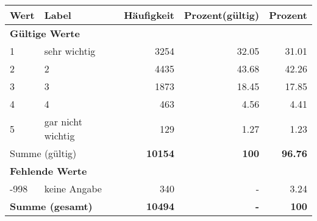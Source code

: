      \begin{longtable}{lXrrr}
     \toprule
     \textbf{Wert} & \textbf{Label} & \textbf{Häufigkeit} & \textbf{Prozent(gültig)} & \textbf{Prozent} \\
     \endhead
     \midrule
     \multicolumn{5}{l}{\textbf{Gültige Werte}}\\

     1 &
     \multicolumn{1}{X}{ sehr wichtig   } &


       \num{3254} &
       \num[round-mode=places,round-precision=2]{32,05} &
         \num[round-mode=places,round-precision=2]{31,01} \\

     2 &
     \multicolumn{1}{X}{ 2   } &


       \num{4435} &
       \num[round-mode=places,round-precision=2]{43,68} &
         \num[round-mode=places,round-precision=2]{42,26} \\

     3 &
     \multicolumn{1}{X}{ 3   } &


       \num{1873} &
       \num[round-mode=places,round-precision=2]{18,45} &
         \num[round-mode=places,round-precision=2]{17,85} \\

     4 &
     \multicolumn{1}{X}{ 4   } &


       \num{463} &
       \num[round-mode=places,round-precision=2]{4,56} &
         \num[round-mode=places,round-precision=2]{4,41} \\

     5 &
     \multicolumn{1}{X}{ gar nicht wichtig   } &


       \num{129} &
       \num[round-mode=places,round-precision=2]{1,27} &
         \num[round-mode=places,round-precision=2]{1,23} \\
     \midrule
     \multicolumn{2}{l}{Summe (gültig)} &
       \textbf{\num{10154}} &
     \textbf{100} &
       \textbf{\num[round-mode=places,round-precision=2]{96,76}} \\
     \multicolumn{5}{l}{\textbf{Fehlende Werte}}\\
       -998 &
       keine Angabe &
         \num{340} &
        - &
         \num[round-mode=places,round-precision=2]{3,24} \\
     \midrule
     \multicolumn{2}{l}{\textbf{Summe (gesamt)}} &
          \textbf{\num{10494}} &
        \textbf{-} &
        \textbf{100} \\
     \bottomrule
     \end{longtable}
     
